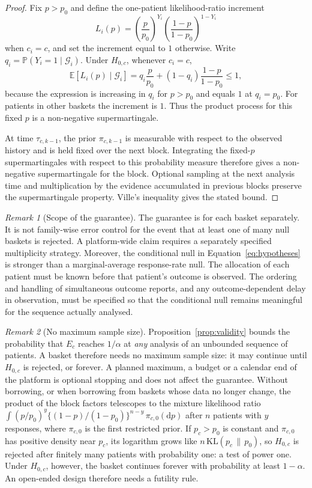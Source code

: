 \documentclass[11pt,a4paper]{article}
\theoremstyle{definition}
\theoremstyle{remark}
\newtheorem{remark}{Remark}
\newcommand{\G}{\mathcal{G}}
\newcommand{\E}{\mathbb{E}}
\renewcommand{\P}{\mathbb{P}}
\begin{document}
\begin{proof}
Fix $p>p_0$ and define the one-patient likelihood-ratio increment
\[
L_i(p)=\left(\frac{p}{p_0}\right)^{Y_i}
       \left(\frac{1-p}{1-p_0}\right)^{1-Y_i}
\]
when $c_i=c$, and set the increment equal to $1$ otherwise. Write
$q_i=\P(Y_i=1\mid\G_i)$. Under $H_{0,c}$, whenever $c_i=c$,
\[
\E[L_i(p)\mid\G_i]
=q_i\frac{p}{p_0}+(1-q_i)\frac{1-p}{1-p_0}\leq 1,
\]
because the expression is increasing in $q_i$ for $p>p_0$ and equals
$1$ at $q_i=p_0$. For patients in other baskets the increment is $1$.
Thus the product process for this fixed $p$ is a non-negative
supermartingale.

At time $\tau_{c,k-1}$, the prior $\pi_{c,k-1}$ is measurable with respect
to the observed history and is held fixed over the next block. Integrating
the fixed-$p$ supermartingales with respect to this probability measure
therefore gives a non-negative supermartingale for the block. Optional
sampling at the next analysis time and multiplication by the evidence
accumulated in previous blocks preserve the supermartingale property.
Ville's inequality gives the stated bound.
\end{proof}

\begin{remark}[Scope of the guarantee]
The guarantee is for each basket separately. It is not family-wise error
control for the event that at least one of many null baskets is rejected.
A platform-wide claim requires a separately specified multiplicity strategy.
Moreover, the conditional null in Equation~\ref{eq:hypotheses} is stronger
than a marginal-average response-rate null. The allocation of each patient
must be known before that patient's outcome is observed. The ordering and
handling of simultaneous outcome reports, and any outcome-dependent delay
in observation, must be specified so that the conditional null remains
meaningful for the sequence actually analysed.
\end{remark}

\begin{remark}[No maximum sample size]\label{rem:open}
Proposition~\ref{prop:validity} bounds the probability that $E_c$ reaches $1/\alpha$ at \emph{any} analysis of an unbounded sequence of patients.
A basket therefore needs no maximum sample size: it may continue until $H_{0,c}$ is rejected, or forever.
A planned maximum, a budget or a calendar end of the platform is optional stopping and does not affect the guarantee.
Without borrowing, or when borrowing from baskets whose data no longer change, the product of the block factors telescopes to the mixture likelihood ratio
$\int (p/p_0)^{y}\{(1-p)/(1-p_0)\}^{n-y}\,\pi_{c,0}(\mathrm dp)$ after $n$ patients with $y$ responses, where $\pi_{c,0}$ is the first restricted prior.
If $p_c>p_0$ is constant and $\pi_{c,0}$ has positive density near $p_c$, its logarithm grows like $n\,\mathrm{KL}(p_c\,\|\,p_0)$, so $H_{0,c}$ is rejected after finitely many patients with probability one: a test of power one.
Under $H_{0,c}$, however, the basket continues forever with probability at least $1-\alpha$.
An open-ended design therefore needs a futility rule.
\end{remark}
\end{document}
